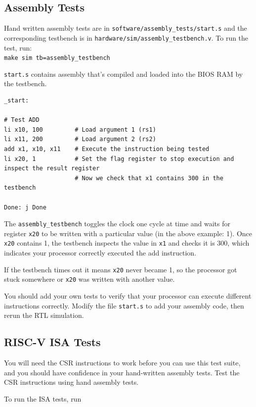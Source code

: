 \documentclass[11pt]{article}
\begin{document}
\subsection{Assembly Tests}
\label{assembly_tests}
Hand written assembly tests are in \verb|software/assembly_tests/start.s| and the corresponding testbench is in \verb|hardware/sim/assembly_testbench.v|.
To run the test, run:\\
\verb|make sim tb=assembly_testbench|

\verb|start.s| contains assembly that's compiled and loaded into the BIOS RAM by the testbench.
\begin{verbatim}
_start:

# Test ADD
li x10, 100         # Load argument 1 (rs1)
li x11, 200         # Load argument 2 (rs2)
add x1, x10, x11    # Execute the instruction being tested
li x20, 1           # Set the flag register to stop execution and inspect the result register
                    # Now we check that x1 contains 300 in the testbench

Done: j Done
\end{verbatim}

The \verb|assembly_testbench| toggles the clock one cycle at time and waits for register \verb|x20| to be written with a particular value (in the above example: 1).
Once \verb|x20| contains 1, the testbench inspects the value in \verb|x1| and checks it is 300, which indicates your processor correctly executed the add instruction.

If the testbench times out it means \verb|x20| never became 1, so the processor got stuck somewhere or \verb|x20| was written with another value.

You should add your own tests to verify that your processor can execute different instructions correctly. Modify the file \verb|start.s| to add your assembly code, then rerun the RTL simulation.

\subsection{RISC-V ISA Tests}\label{riscv-isa-tests}
You will need the CSR instructions to work before you can use this test suite, and you should have confidence in your hand-written assembly tests.
Test the CSR instructions using hand assembly tests.

To run the ISA tests, run
\end{document}
